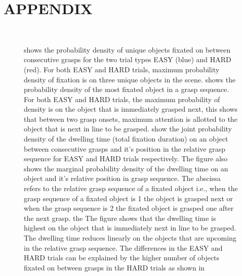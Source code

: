 \section{APPENDIX}

\begin{figure}[h]
    \centering
    \\
    \caption[]{\protect{} shows the probability density of unique objects fixated on between consecutive grasps for the two trial types EASY (blue) and HARD (red). For both EASY and HARD trials, maximum probability density of fixation is on three unique objects in the scene. \protect{} shows the probability density of the most fixated object in a grasp sequence. For both EASY and HARD trials, the maximum probability of density is on the object that is immediately grasped next, this shows that between two grasp onsets, maximum attention is allotted to the object that is next in line to be grasped. 
    \protect{}\protect{} show the joint probability density of the dwelling time (total fixation duration) on an object between consecutive grasps and it's position in the relative grasp sequence for EASY and HARD trials respectively. The figure also shows the marginal probability density of the dwelling time  on an object and it's relative position in grasp sequence. The abscissa refers to the relative grasp sequence of a fixated object i.e., when the grasp sequence of a fixated object is 1 the object is grasped next or when the grasp sequence is 2 the fixated object is grasped one after the next grasp.  the The figure shows that the dwelling time is highest on the object that is immediately next in line to be grasped. The dwelling time reduces linearly on the objects that are upcoming in the relative grasp sequence. The differences in the EASY and HARD trials can be explained by the higher number of objects fixated on between grasps in the HARD trials as shown in \protect{}
    }
    \label{figure:planning_behavior}
\end{figure}


